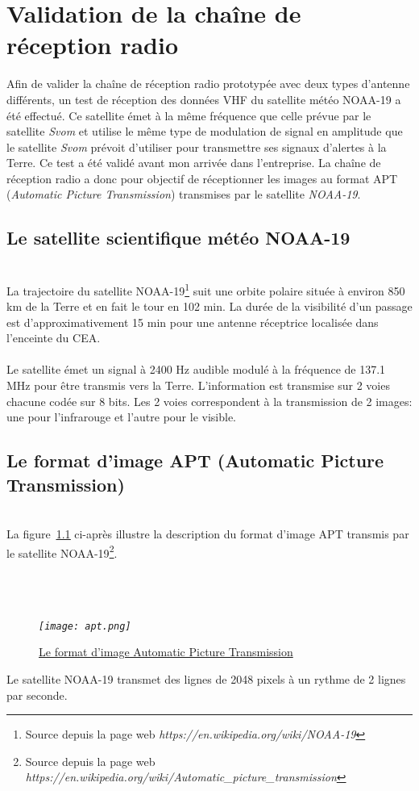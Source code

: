 \documentclass[12pt,fleqn]{book} %
\begin{document}
\chapter{Validation de la chaîne de réception radio}
Afin de valider la chaîne de réception radio prototypée avec deux types d'antenne différents, un test de réception des données VHF du satellite météo NOAA-19 a été effectué. Ce satellite émet à la même fréquence que celle prévue par le satellite \emph{Svom} et utilise le même type de modulation de signal en amplitude que le satellite \emph{Svom} prévoit d'utiliser pour transmettre ses signaux d'alertes à la Terre. Ce test a été validé avant mon arrivée dans l'entreprise.
La chaîne de réception radio a donc pour objectif de réceptionner les images au format APT (\emph{Automatic Picture Transmission}) transmises par le satellite \emph{NOAA-19}.
\section{Le satellite scientifique météo NOAA-19}
~\\\indent La trajectoire du satellite NOAA-19\footnote{Source depuis la page web \emph{https://en.wikipedia.org/wiki/NOAA-19}} suit une orbite polaire située à environ 850 km de la Terre et en fait le tour en 102 min. La durée de la visibilité d'un passage est d'approximativement 15 min pour une antenne réceptrice localisée dans l'enceinte du CEA.
~\\\\Le satellite émet un signal à 2400 Hz audible modulé à la fréquence de 137.1 MHz pour être transmis vers la Terre. L'information est transmise sur 2 voies chacune codée sur 8 bits. Les 2 voies correspondent à la transmission de 2 images: une pour l'infrarouge et l'autre pour le visible.
\section{Le format d'image APT (Automatic Picture Transmission)}
~\\\indent La figure~\underline{\color{blue}\ref{apt}} ci-après illustre la description du format d'image APT transmis par le satellite NOAA-19\footnote{Source depuis la page web \emph{https://en.wikipedia.org/wiki/Automatic\_picture\_transmission}}.
~\\\\
~\\\\
\begin{figure}[H]
	\centering
	\itshape
	\texttt{[image: apt.png]}
	\caption{\label{apt} \underline{Le format d'image Automatic Picture Transmission}}
\end{figure}
\noindent Le satellite NOAA-19 transmet des lignes de 2048 pixels à un rythme de 2 lignes par seconde.
\end{document}
